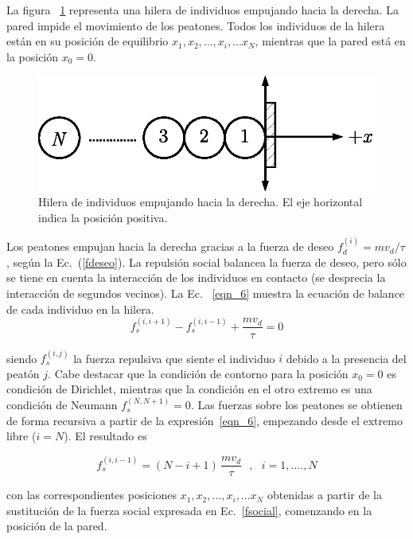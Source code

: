La figura ~\ref{hilera2} representa una hilera de individuos empujando hacia la derecha. La pared impide el movimiento de los peatones. Todos los individuos de la hilera están en su posición de equilibrio $x_1,x_2,...,x_{i},...x_N$, mientras que la pared está en la posición $x_0=0$. 

\begin{figure}[!htbp]
\center
\includegraphics[scale=1]{figuras/hilera.eps}
\caption{\label{hilera2} Hilera de individuos empujando hacia la derecha. El eje horizontal indica la posición positiva. }
\end{figure}

Los peatones empujan hacia la derecha gracias a la fuerza de deseo
$f_d^{(i)}=mv_d/\tau$, según la Ec.~(\ref{fdeseo}). La repulsión social balancea la fuerza de deseo, pero sólo se tiene en cuenta la interacción de los individuos en contacto (se desprecia la interacción de segundos vecinos). La Ec. ~\ref{eqn_6} muestra la ecuación de balance de cada individuo en la hilera. \\

\begin{equation}
 f_s^{(i,i+1)}-f_s^{(i,i-1)}+\displaystyle\frac{mv_d}{\tau}=0\label{eqn_6}
\end{equation}

siendo $f_s^{(i,j)}$ la fuerza repulsiva que siente el individuo $i$ debido a la presencia del peatón $j$. Cabe destacar que la condición de contorno para la posición $x_0=0$ es condición de Dirichlet, mientras que la condición en el otro extremo es una condición de Neumann $f_s^{(N,N+1)}=0$. Las fuerzas sobre los peatones se obtienen de forma recursiva a partir de la expresión~\ref{eqn_6}, empezando desde el extremo libre ($i=N$). El resultado es

\begin{equation}
f_s^{(i,i-1)}=(N-i+1)\,\displaystyle\frac{mv_d}{\tau}\ \ \ , \ \ \ 
i=1,....,N\label{eqn_7}
\end{equation}

con las correspondientes posiciones  $x_1,x_2,...,x_{i},...x_N$ obtenidas a partir de la sustitución de la fuerza social expresada en Ec.~\ref{fsocial}, comenzando en la posición de la pared.

